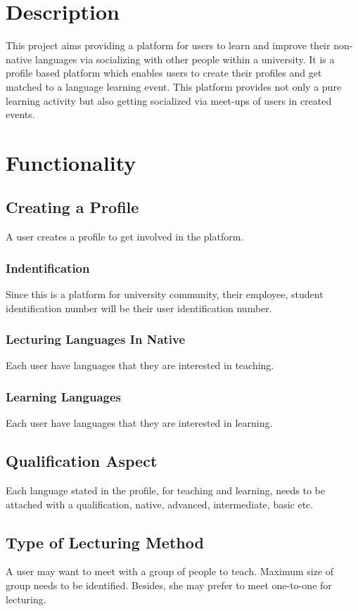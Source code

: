 \lstset{style=mystyle}
\usepackage{amsmath}


\pagestyle{empty} %

\titleBC %
\newpage
\section{Description}
This project aims providing a platform for users to learn and improve their non-native languages via socializing with other  people within a university. It is a profile based platform which enables users to create their profiles and get matched to a language learning event. This platform provides not only a pure learning activity but also getting socialized via meet-ups of users in created events.
\section{Functionality}
\subsection{Creating a Profile}
A user creates a profile to get involved in the platform.
 \subsubsection{Indentification}Since this is a platform for university community, their employee, student identification number will be their user identification number. 
 \subsubsection{Lecturing Languages In Native} Each user have languages that they are interested in teaching.  
 \subsubsection{Learning Languages}Each user have languages that they are interested in learning.
\subsection{Qualification Aspect} Each language stated in the profile, for teaching and learning, needs to be attached with a qualification, native, advanced, intermediate, basic etc.  
 \subsection{Type of Lecturing Method} A user may want to meet with a group of people to teach. Maximum size of group needs to be identified. Besides, she may prefer to meet one-to-one for lecturing.
